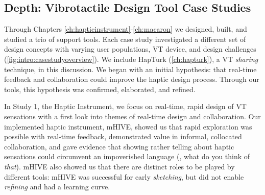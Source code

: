 \subsection{Depth: Vibrotactile Design Tool Case Studies}
Through Chapters \ref{ch:hapticinstrument}-\ref{ch:macaron} we designed, built, and studied a trio of \haxd support tools.
Each case study investigated a different set of design concepts with varying user populations, VT device, and design challenges (\autoref{fig:intro:casestudyoverview}).
We include HapTurk (\autoref{ch:hapturk}), a VT \emph{sharing} technique, in this discussion.
We began with an initial hypothesis: that real-time feedback and collaboration could improve the haptic design process.
Through our tools, this hypothesis was confirmed, elaborated, and refined.

In Study 1, the Haptic Instrument, we focus on real-time, rapid design of VT sensations with a first look into themes of real-time design and collaboration.
Our implemented haptic instrument, mHIVE, showed us that rapid exploration was possible with real-time feedback, demonstrated value in informal, collocated collaboration, and gave evidence that showing rather telling about haptic sensations could circumvent an impoverished language (\eg, what do you think of \emph{that}).
 mHIVE also showed us that there are distinct roles to be played by different tools: mHIVE was successful for early \emph{sketching}, but did not enable \emph{refining} and had a learning curve.


